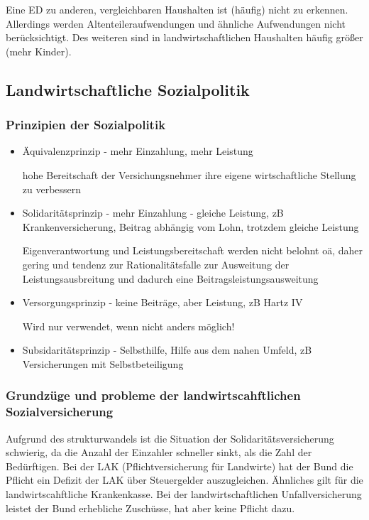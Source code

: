 \documentclass[11pt]{scrartcl}
\begin{document}
Eine \ac{ED} zu anderen, vergleichbaren Haushalten ist (häufig) nicht zu erkennen.
Allerdings werden Altenteileraufwendungen und ähnliche Aufwendungen nicht berücksichtigt.
Des weiteren sind in landwirtschaftlichen Haushalten häufig größer (mehr Kinder).

\subsection{Landwirtschaftliche Sozialpolitik}

\subsubsection{Prinzipien der Sozialpolitik}

\begin{itemize}
	\item Äquivalenzprinzip - mehr Einzahlung, mehr Leistung

		hohe Bereitschaft der Versichungsnehmer ihre eigene wirtschaftliche Stellung zu verbessern
	\item Solidaritätsprinzip - mehr Einzahlung - gleiche Leistung, zB Krankenversicherung, Beitrag abhängig vom Lohn, trotzdem gleiche Leistung

		Eigenverantwortung und Leistungsbereitschaft werden nicht belohnt oä, daher gering und tendenz zur Rationalitätsfalle zur Ausweitung der Leistungsausbreitung und dadurch eine Beitragsleistungsausweitung

	\item Versorgungsprinzip - keine Beiträge, aber Leistung, zB Hartz IV

		Wird nur verwendet, wenn nicht anders möglich!
	\item Subsidaritätsprinzip - Selbsthilfe, Hilfe aus dem nahen Umfeld, zB Versicherungen mit Selbstbeteiligung
\end{itemize}

\subsubsection{Grundzüge und probleme der landwirtscahftlichen Sozialversicherung}

Aufgrund des strukturwandels ist die Situation der Solidaritätsversicherung schwierig, da die Anzahl der Einzahler schneller sinkt, als die Zahl der Bedürftigen.
Bei der \ac{LAK} (Pflichtversicherung für Landwirte) hat der Bund die Pflicht ein Defizit der \ac{LAK} über Steuergelder auszugleichen.
Ähnliches gilt für die landwirtscahftliche Krankenkasse.
Bei der landwirtschaftlichen Unfallversicherung leistet der Bund erhebliche Zuschüsse, hat aber keine Pflicht dazu.
\end{document}
